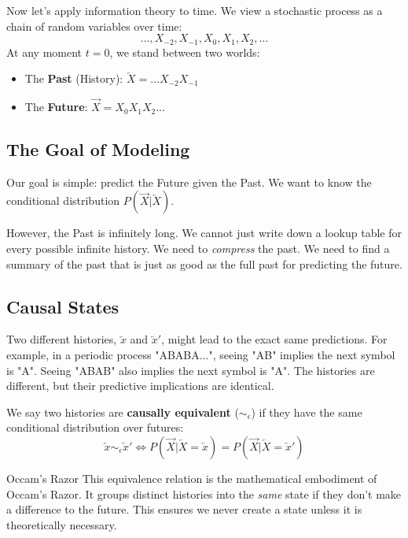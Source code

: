 Now let's apply information theory to time. We view a stochastic process as a chain of random variables over time:
\[ \dots, X_{-2}, X_{-1}, X_0, X_1, X_2, \dots \]
At any moment $t=0$, we stand between two worlds:
\begin{itemize}
    \item The \textbf{Past} (History): $\overleftarrow{X} = \dots X_{-2} X_{-1}$
    \item The \textbf{Future}: $\vec{X} = X_0 X_1 X_2 \dots$
\end{itemize}

\subsection{The Goal of Modeling}
Our goal is simple: predict the Future given the Past. We want to know the conditional distribution $P(\vec{X} | \overleftarrow{X})$.

However, the Past is infinitely long. We cannot just write down a lookup table for every possible infinite history. We need to \textit{compress} the past. We need to find a summary of the past that is just as good as the full past for predicting the future.

\subsection{Causal States}
Two different histories, $\overleftarrow{x}$ and $\overleftarrow{x}'$, might lead to the exact same predictions.
For example, in a periodic process "ABABA...", seeing "AB" implies the next symbol is "A". Seeing "ABAB" also implies the next symbol is "A". The histories are different, but their predictive implications are identical.

We say two histories are \textbf{causally equivalent} ($\sim_\epsilon$) if they have the same conditional distribution over futures:
\begin{equation}
    \overleftarrow{x} \sim_\epsilon \overleftarrow{x}' \iff P(\vec{X} | \overleftarrow{X} = \overleftarrow{x}) = P(\vec{X} | \overleftarrow{X} = \overleftarrow{x}')
\end{equation}

\begin{sidebar}{Occam's Razor}
This equivalence relation is the mathematical embodiment of Occam's Razor. It groups distinct histories into the \textit{same} state if they don't make a difference to the future. This ensures we never create a state unless it is theoretically necessary.
\end{sidebar}

